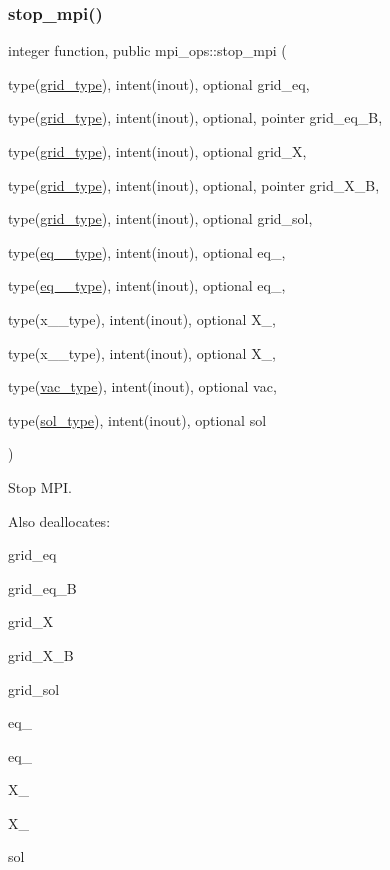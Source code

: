 \subsubsection{\texorpdfstring{stop\+\_\+mpi()}{stop\_mpi()}}
{\footnotesize\ttfamily integer function, public mpi\+\_\+ops\+::stop\+\_\+mpi (\begin{DoxyParamCaption}\item[{type(\hyperlink{structgrid__vars_1_1grid__type}{grid\+\_\+type}), intent(inout), optional}]{grid\+\_\+eq,  }\item[{type(\hyperlink{structgrid__vars_1_1grid__type}{grid\+\_\+type}), intent(inout), optional, pointer}]{grid\+\_\+eq\+\_\+B,  }\item[{type(\hyperlink{structgrid__vars_1_1grid__type}{grid\+\_\+type}), intent(inout), optional}]{grid\+\_\+X,  }\item[{type(\hyperlink{structgrid__vars_1_1grid__type}{grid\+\_\+type}), intent(inout), optional, pointer}]{grid\+\_\+\+X\+\_\+B,  }\item[{type(\hyperlink{structgrid__vars_1_1grid__type}{grid\+\_\+type}), intent(inout), optional}]{grid\+\_\+sol,  }\item[{type(\hyperlink{structeq__vars_1_1eq__1__type}{eq\+\_\+1\+\_\+type}), intent(inout), optional}]{eq\+\_,  }\item[{type(\hyperlink{structeq__vars_1_1eq__2__type}{eq\+\_\+2\+\_\+type}), intent(inout), optional}]{eq\+\_,  }\item[{type(x\+\_\+1\+\_\+type), intent(inout), optional}]{X\+\_,  }\item[{type(x\+\_\+2\+\_\+type), intent(inout), optional}]{X\+\_,  }\item[{type(\hyperlink{structvac__vars_1_1vac__type}{vac\+\_\+type}), intent(inout), optional}]{vac,  }\item[{type(\hyperlink{structsol__vars_1_1sol__type}{sol\+\_\+type}), intent(inout), optional}]{sol }\end{DoxyParamCaption})}



Stop M\+PI. 

Also deallocates\+:
\begin{DoxyItemize}
\item {\ttfamily grid\+\_\+eq} 
\item {\ttfamily grid\+\_\+eq\+\_\+B} 
\item {\ttfamily grid\+\_\+X} 
\item {\ttfamily grid\+\_\+\+X\+\_\+B} 
\item {\ttfamily grid\+\_\+sol} 
\item {\ttfamily eq\+\_} 
\item {\ttfamily eq\+\_} 
\item {\ttfamily X\+\_} 
\item {\ttfamily X\+\_} 
\item {\ttfamily sol} 
\end{DoxyItemize}

